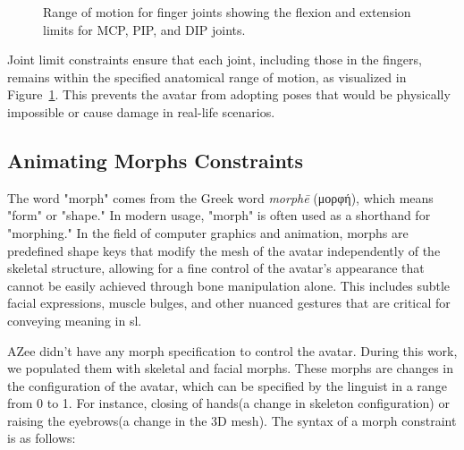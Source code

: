 \documentclass[../../main.tex]{subfiles}
\begin{document}
{\begin{figure}[h!]
    \centering
    \caption{Range of motion for finger joints showing the flexion and extension limits for MCP, PIP, and DIP joints.}
    \label{fig:joint_limits_finger}
\end{figure}

Joint limit constraints ensure that each joint, including those in the fingers, remains within the specified anatomical range of motion, as visualized in Figure~\ref{fig:joint_limits_finger}. This prevents the avatar from adopting poses that would be physically impossible or cause damage in real-life scenarios.

\subsection{Animating Morphs Constraints}
\label{ch:avatar_creation_pose_synthesis:proc_rig_signing_avatars:morph_constraints}

The word "morph" comes from the Greek word \textit{morphē} (\textgreek{μορφή}), which means "form" or "shape." In modern usage, "morph" is often used as a shorthand for "morphing." In the field of computer graphics and animation, morphs are predefined shape keys that modify the mesh of the avatar independently of the skeletal structure, allowing for a fine control of the avatar's appearance that cannot be easily achieved through bone manipulation alone. This includes subtle facial expressions, muscle bulges, and other nuanced gestures that are critical for conveying meaning in \gls{sl}.

AZee didn't have any morph specification to control the avatar. During this work, we populated them with skeletal and facial morphs. These morphs are changes in the configuration of the avatar, which can be specified by the linguist in a range from 0 to 1. For instance, closing of hands(a change in skeleton configuration) or raising the eyebrows(a change in the 3D mesh). The syntax of a morph constraint is as follows:

}
\end{document}

